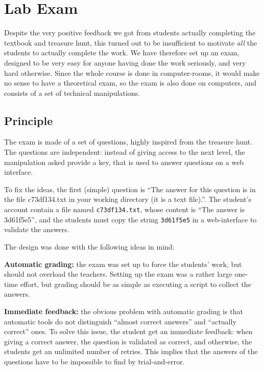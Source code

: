 \documentclass{sig-alternate}
\begin{document}
\section{Lab Exam}
\label{sec=lab-work-exam}

Despite the very positive feedback we got from students actually
completing the textbook and treasure hunt, this turn\-ed out to be
insufficient to motivate \emph{all} the students to actually complete the
work. We have therefore set up an exam, designed to be very easy
for anyone having done the work seriously, and very hard
otherwise. Since the whole course is done in computer-rooms, it would
make no sense to have a theoretical exam, so the exam is also done on
computers, and consists of a set of technical manipulations.

\subsection{Principle}

The exam is made of a set of questions, highly inspired from the
treasure hunt. The questions are independent: instead of giving access
to the next level, the manipulation asked provide a key, that is used
to answer questions on a web interface.

\label{sample-questions}
To fix the ideas, the first (simple) question is ``The answer for this
question is in the file c73df134.txt in your working directory (it is
a text file).''. The
student's account contain a file named \texttt{c73df134.txt}, whose
content is ``The answer is 3d61f5e5'', and the students must copy the
string \texttt{3d61f5e5} in a web-interface to validate the answers.

The design was done with the following ideas in mind:

\textbf{Automatic grading:} the exam was set up to force the students'
  work, but should not overload the teachers. Setting up the exam was
  a rather large one-time effort, but grading should be as simple as
  executing a script to collect the answers.

\textbf{Immediate feedback:} the obvious problem with automatic grading
  is that automatic tools do not distinguish ``almost correct
  answers'' and ``actually correct'' ones. To solve this issue, the
  student get an immediate feedback: when giving a correct answer, the
  question is validated as correct, and otherwise, the students get an
  unlimited number of retries. This implies that the answers of the
  questions have to be impossible to find by trial-and-error.
\end{document}
